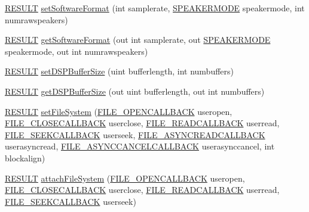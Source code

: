 \begin{DoxyCompactItemize}
\item 
\hyperlink{namespace_f_m_o_d_a305d1176ef3f8c8815861a60407ac33d}{R\+E\+S\+U\+LT} \hyperlink{class_f_m_o_d_1_1_system_a53f963856ac3683ca81bdfb460fe1b19}{set\+Software\+Format} (int samplerate, \hyperlink{namespace_f_m_o_d_aa0732e7e8efd3b96b526a7f2f8479634}{S\+P\+E\+A\+K\+E\+R\+M\+O\+DE} speakermode, int numrawspeakers)
\item 
\hyperlink{namespace_f_m_o_d_a305d1176ef3f8c8815861a60407ac33d}{R\+E\+S\+U\+LT} \hyperlink{class_f_m_o_d_1_1_system_a991aa0b7999f27f24bf832aec287492f}{get\+Software\+Format} (out int samplerate, out \hyperlink{namespace_f_m_o_d_aa0732e7e8efd3b96b526a7f2f8479634}{S\+P\+E\+A\+K\+E\+R\+M\+O\+DE} speakermode, out int numrawspeakers)
\item 
\hyperlink{namespace_f_m_o_d_a305d1176ef3f8c8815861a60407ac33d}{R\+E\+S\+U\+LT} \hyperlink{class_f_m_o_d_1_1_system_a7341c3159435569b41e0004b0a2d674a}{set\+D\+S\+P\+Buffer\+Size} (uint bufferlength, int numbuffers)
\item 
\hyperlink{namespace_f_m_o_d_a305d1176ef3f8c8815861a60407ac33d}{R\+E\+S\+U\+LT} \hyperlink{class_f_m_o_d_1_1_system_a2a4dafa899dcdf27816edaaa4633f17e}{get\+D\+S\+P\+Buffer\+Size} (out uint bufferlength, out int numbuffers)
\item 
\hyperlink{namespace_f_m_o_d_a305d1176ef3f8c8815861a60407ac33d}{R\+E\+S\+U\+LT} \hyperlink{class_f_m_o_d_1_1_system_a766feb3efc89241373feea0bfe84b39e}{set\+File\+System} (\hyperlink{namespace_f_m_o_d_a6aacb40c0bfa3448934de11beb9ed447}{F\+I\+L\+E\+\_\+\+O\+P\+E\+N\+C\+A\+L\+L\+B\+A\+CK} useropen, \hyperlink{namespace_f_m_o_d_ae4fc590f93bf7202703858219d3b2fbd}{F\+I\+L\+E\+\_\+\+C\+L\+O\+S\+E\+C\+A\+L\+L\+B\+A\+CK} userclose, \hyperlink{namespace_f_m_o_d_a074a94c39aa2d2569a57ed255f6c9011}{F\+I\+L\+E\+\_\+\+R\+E\+A\+D\+C\+A\+L\+L\+B\+A\+CK} userread, \hyperlink{namespace_f_m_o_d_a5fb329aae3aea0658fa46c593359ead3}{F\+I\+L\+E\+\_\+\+S\+E\+E\+K\+C\+A\+L\+L\+B\+A\+CK} userseek, \hyperlink{namespace_f_m_o_d_a12de5190001a0edf457fa49c0a2bde10}{F\+I\+L\+E\+\_\+\+A\+S\+Y\+N\+C\+R\+E\+A\+D\+C\+A\+L\+L\+B\+A\+CK} userasyncread, \hyperlink{namespace_f_m_o_d_a3122c90ec3ea0bfc0ec3b7372267b5f1}{F\+I\+L\+E\+\_\+\+A\+S\+Y\+N\+C\+C\+A\+N\+C\+E\+L\+C\+A\+L\+L\+B\+A\+CK} userasynccancel, int blockalign)
\item 
\hyperlink{namespace_f_m_o_d_a305d1176ef3f8c8815861a60407ac33d}{R\+E\+S\+U\+LT} \hyperlink{class_f_m_o_d_1_1_system_a479b01d9ae58af5ab149a7b133656248}{attach\+File\+System} (\hyperlink{namespace_f_m_o_d_a6aacb40c0bfa3448934de11beb9ed447}{F\+I\+L\+E\+\_\+\+O\+P\+E\+N\+C\+A\+L\+L\+B\+A\+CK} useropen, \hyperlink{namespace_f_m_o_d_ae4fc590f93bf7202703858219d3b2fbd}{F\+I\+L\+E\+\_\+\+C\+L\+O\+S\+E\+C\+A\+L\+L\+B\+A\+CK} userclose, \hyperlink{namespace_f_m_o_d_a074a94c39aa2d2569a57ed255f6c9011}{F\+I\+L\+E\+\_\+\+R\+E\+A\+D\+C\+A\+L\+L\+B\+A\+CK} userread, \hyperlink{namespace_f_m_o_d_a5fb329aae3aea0658fa46c593359ead3}{F\+I\+L\+E\+\_\+\+S\+E\+E\+K\+C\+A\+L\+L\+B\+A\+CK} userseek)

\end{DoxyCompactItemize}
